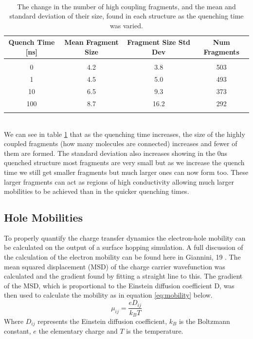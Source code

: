 \\
\begin{table}[ht]
	\begin{tabular}{cccc}
		\textbf{Quench Time} [ns] & \textbf{Mean Fragment Size} & \textbf{Fragment Size Std Dev} & \textbf{Num Fragments} \\
		\hline &&&\\
		0 & 4.2 & 3.8 & 503 \\
		1 & 4.5 & 5.0 & 493 \\
		10 & 6.5 & 9.3 & 373 \\
		100 & 8.7 & 16.2 & 292 \\
		\hline &&&\\
	\end{tabular}
	\caption{\label{tab:cluster_sizes}The change in the number of high coupling fragments, and the mean and standard deviation of their size, found in each structure as the quenching time was varied.}
\end{table}
\\
We can see in table \ref{tab:cluster_sizes} that as the quenching time increases, the size of the highly coupled fragments (how many molecules are connected) increases and fewer of them are formed. The standard deviation also increases showing in the 0ns quenched structure most fragments are very small but as we increase the quench time we still get smaller fragments but much larger ones can now form too. These larger fragments can act as regions of high conductivity allowing much larger mobilities to be achieved than in the quicker quenching times.

\subsection{Hole Mobilities}
\label{sect:mobilities}
To properly quantify the charge transfer dynamics the electron-hole mobility can be calculated on the output of a surface hopping simulation. A full discussion of the calculation of the electron mobility can be found here in Giannini, 19 \cite{Giannini2019}. The mean squared displacement (MSD) of the charge carrier wavefunction was calculated and the gradient found by fitting a straight line to this. The gradient of the MSD, which is proportional to the Einstein diffusion coefficient D, was then used to calculate the mobility as in equation \eqref{eq:mobility} below.
\begin{equation}
	\mu_{ij} = \frac{e D_{ij}}{k_{B} T}
	\label{eq:mobility}
\end{equation}
Where $D_{ij}$ represents the Einstein diffusion coefficient, $k_{B}$ is the Boltzmann constant, $e$ the elementary charge and $T$ is the temperature.
